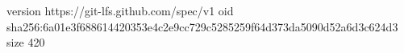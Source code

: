 version https://git-lfs.github.com/spec/v1
oid sha256:6a01e3f688614420353e4c2e9cc729c5285259f64d373da5090d52a6d3c624d3
size 420
